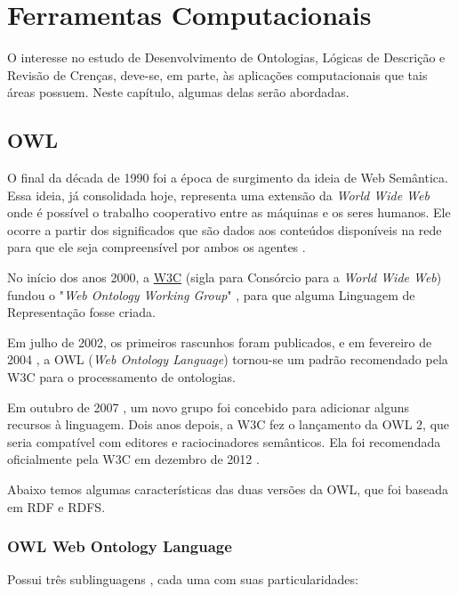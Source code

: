\chapter{Ferramentas Computacionais}

\lettrine{O}{} interesse no estudo de Desenvolvimento de Ontologias, Lógicas de Descrição e Revisão de Crenças, deve-se, em parte, às aplicações computacionais que tais áreas possuem. Neste capítulo, algumas delas serão abordadas.

\section{OWL}

O final da década de 1990 foi a época de surgimento da ideia de Web Semântica. Essa ideia, já consolidada hoje, representa uma extensão da \textit{World Wide Web} onde é possível o trabalho cooperativo entre as máquinas e os seres humanos. Ele ocorre a partir dos significados que são dados aos conteúdos disponíveis na rede para que ele seja compreensível por ambos os agentes \cite{ferramentasHerman}.

No início dos anos 2000, a \href{https://www.w3.org}{W3C} (sigla para Consórcio para a \textit{World Wide Web}) fundou o "\textit{Web Ontology Working Group}" \cite{ferramentasGrupo}, para que alguma Linguagem de Representação fosse criada. 

Em julho de 2002, os primeiros rascunhos foram publicados, e em fevereiro de 2004 \cite{ferramentasReco}, a OWL (\textit{Web Ontology Language}) tornou-se um padrão recomendado pela W3C para o processamento de ontologias.

Em outubro de 2007 \cite{ferramentasOWLGrupo2}, um novo grupo foi concebido para adicionar alguns recursos à linguagem. Dois anos depois, a W3C fez o lançamento da OWL 2, que seria compatível com editores e raciocinadores semânticos. Ela foi recomendada oficialmente pela W3C em dezembro de 2012 \cite{ferramentasOWLReco2}.

Abaixo temos algumas características das duas versões da OWL, que foi baseada em RDF e RDFS.

\subsection{OWL Web Ontology Language}

Possui três sublinguagens \cite{ferramentasOWL1}, cada uma com suas particularidades:

